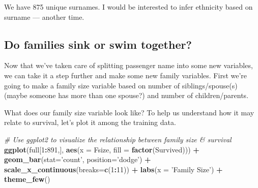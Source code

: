 \documentclass[]{book}
\newenvironment{Shaded}{\begin{snugshade}}{\end{snugshade}}
\newcommand{\KeywordTok}[1]{\textcolor[rgb]{0.13,0.29,0.53}{\textbf{#1}}}
\newcommand{\DataTypeTok}[1]{\textcolor[rgb]{0.13,0.29,0.53}{#1}}
\newcommand{\DecValTok}[1]{\textcolor[rgb]{0.00,0.00,0.81}{#1}}
\newcommand{\StringTok}[1]{\textcolor[rgb]{0.31,0.60,0.02}{#1}}
\newcommand{\CommentTok}[1]{\textcolor[rgb]{0.56,0.35,0.01}{\textit{#1}}}
\newcommand{\OperatorTok}[1]{\textcolor[rgb]{0.81,0.36,0.00}{\textbf{#1}}}
\newcommand{\NormalTok}[1]{#1}
\theoremstyle{definition}
\theoremstyle{definition}
\theoremstyle{definition}
\theoremstyle{remark}
\begin{document}
We have 875 unique surnames. I would be interested to infer ethnicity
based on surname --- another time.

\subsection{Do families sink or swim
together?}\label{do-families-sink-or-swim-together}

Now that we've taken care of splitting passenger name into some new
variables, we can take it a step further and make some new family
variables. First we're going to make a family size variable based on
number of siblings/spouse(s) (maybe someone has more than one spouse?)
and number of children/parents.

\begin{Shaded}
\end{Shaded}

What does our family size variable look like? To help us understand how
it may relate to survival, let's plot it among the training data.

\begin{Shaded}
\begin{Highlighting}[]
\CommentTok{# Use ggplot2 to visualize the relationship between family size & survival}
\KeywordTok{ggplot}\NormalTok{(full[}\DecValTok{1}\OperatorTok{:}\DecValTok{891}\NormalTok{,], }\KeywordTok{aes}\NormalTok{(}\DataTypeTok{x =}\NormalTok{ Fsize, }\DataTypeTok{fill =} \KeywordTok{factor}\NormalTok{(Survived))) }\OperatorTok{+}
\StringTok{  }\KeywordTok{geom_bar}\NormalTok{(}\DataTypeTok{stat=}\StringTok{'count'}\NormalTok{, }\DataTypeTok{position=}\StringTok{'dodge'}\NormalTok{) }\OperatorTok{+}
\StringTok{  }\KeywordTok{scale_x_continuous}\NormalTok{(}\DataTypeTok{breaks=}\KeywordTok{c}\NormalTok{(}\DecValTok{1}\OperatorTok{:}\DecValTok{11}\NormalTok{)) }\OperatorTok{+}
\StringTok{  }\KeywordTok{labs}\NormalTok{(}\DataTypeTok{x =} \StringTok{'Family Size'}\NormalTok{) }\OperatorTok{+}
\StringTok{  }\KeywordTok{theme_few}\NormalTok{()}
\end{Highlighting}
\end{Shaded}
\end{document}
